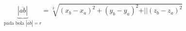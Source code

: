 \noindent \begin{align}\label{equ:bola}
	\underbrace{|\overline{ab}|}_{\text{pada bola $|\overline{ab}| = r$}}
	= \sqrt[2]{(x_{b} - x_{a})^{2} + (y_{b} - y_{a})^{2} +
		\vert\vert(z_{b} - z_{a})^{2}}
\end{align}

